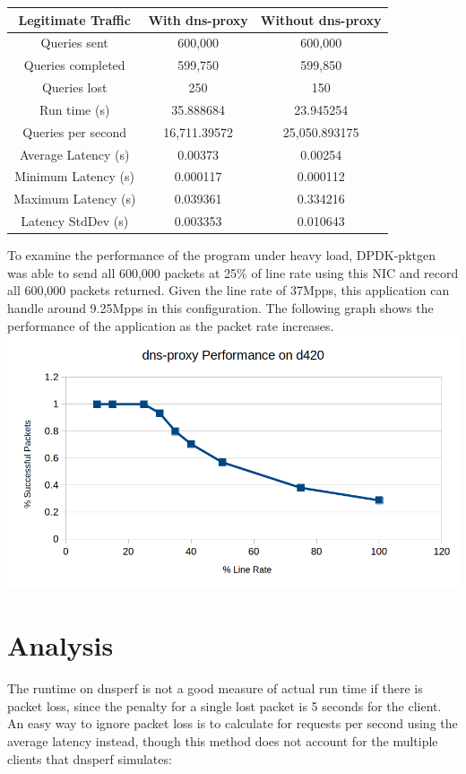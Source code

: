 \documentclass[12pt]{extarticle}
\begin{document}
\begin{center}
\begin{tabular}{ ||c|c|c|| }
\hline
Legitimate Traffic & With dns-proxy & Without dns-proxy \\
\hline
Queries sent & 600,000 & 600,000 \\
Queries completed & 599,750 & 599,850 \\
Queries lost & 250 & 150 \\
Run time (s) & 35.888684 & 23.945254 \\
Queries per second & 16,711.39572 & 25,050.893175 \\
Average Latency (s) & 0.00373 & 0.00254 \\
Minimum Latency (s) & 0.000117 & 0.000112 \\
Maximum Latency (s) & 0.039361 & 0.334216 \\
Latency StdDev (s) & 0.003353 & 0.010643 \\
\hline
\end{tabular}
\end{center}

To examine the performance of the program under heavy load, DPDK-pktgen was able to send all 600,000 packets at 25\% of line rate using this NIC and record all 600,000 packets returned. Given the line rate of 37Mpps, this application can handle around 9.25Mpps in this configuration. The following graph shows the performance of the application as the packet rate increases. \\

\noindent
\includegraphics[width=\textwidth]{performance.png}

\section{Analysis}
The runtime on dnsperf is not a good measure of actual run time if there is packet loss, since the penalty for a single lost packet is 5 seconds for the client. An easy way to ignore packet loss is to calculate for requests per second using the average latency instead, though this method does not account for the multiple clients that dnsperf simulates:
\end{document}
